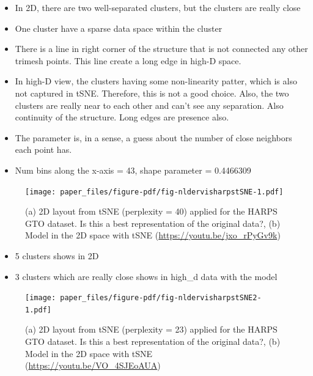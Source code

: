 \documentclass[
  12pt]{article}
\begin{document}
\begin{itemize}
\item
  In 2D, there are two well-separated clusters, but the clusters are
  really close
\item
  One cluster have a sparse data space within the cluster
\item
  There is a line in right corner of the structure that is not connected
  any other trimesh points. This line create a long edge in high-D
  space.
\item
  In high-D view, the clusters having some non-linearity patter, which
  is also not captured in tSNE. Therefore, this is not a good choice.
  Also, the two clusters are really near to each other and can't see any
  separation. Also continuity of the structure. Long edges are presence
  also.
\item
  The parameter is, in a sense, a guess about the number of close
  neighbors each point has.
\item
  Num bins along the x-axis = 43, shape parameter = 0.4466309
\end{itemize}

\begin{figure}[h]

{\centering \texttt{[image: paper\_files/figure-pdf/fig-nldervisharpstSNE-1.pdf]}

}

\caption{\label{fig-nldervisharpstSNE}(a) 2D layout from tSNE
(perplexity = 40) applied for the HARPS GTO dataset. Is this a best
representation of the original data?, (b) Model in the 2D space with
tSNE (\url{https://youtu.be/jxo_rPyGv9k})}

\end{figure}

\begin{itemize}
\item
  5 clusters shows in 2D
\item
  3 clusters which are really close shows in high\_d data with the model
\end{itemize}

\begin{figure}[h]

{\centering \texttt{[image: paper\_files/figure-pdf/fig-nldervisharpstSNE2-1.pdf]}

}

\caption{\label{fig-nldervisharpstSNE2}(a) 2D layout from tSNE
(perplexity = 23) applied for the HARPS GTO dataset. Is this a best
representation of the original data?, (b) Model in the 2D space with
tSNE (\url{https://youtu.be/VO_4SJEoAUA})}

\end{figure}
\end{document}
